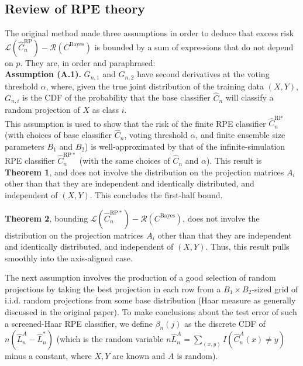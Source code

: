 \documentclass[ejs,preprint]{imsart}
\newcommand\cbayes{C^{\mathrm{Bayes}}}
\newcommand\crpnhat{\hat{C}_{n}^{\mathrm{RP}}}
\newcommand\crpnhatstar{\hat{C}_{n}^{\mathrm{RP*}}}
\newcommand\risk{\mathcal{L}}
\newcommand\rrisk{\mathcal{R}}
\begin{document}
\subsection{Review of RPE theory}\label{sec:review}

The original method made three assumptions in order to deduce that
excess risk $\risk(\crpnhat)-\rrisk(\cbayes)$ is bounded by a sum
of expressions that do not depend on $p$. They are, in order and
paraphrased:\\


\noindent \textbf{Assumption (A.1).} $G_{n,1}$ and $G_{n,2}$ have
second derivatives at the voting threshold $\alpha$, where, given
the true joint distribution of the training data $(X,Y)$, $G_{n,i}$
is the CDF of the probability that the base classifier $\hat{C}_{n}$
will classify a random projection of $X$ as class $i$.\\


This assumption is used to show that the risk of the finite
RPE classifier $\crpnhat$ (with choices of base classifier $\hat{C}_{n}$,
voting threshold $\alpha$, and finite ensemble size parameters $B_{1}$
and $B_{2}$) is well-approximated by that of the infinite-simulation
RPE classifier $\crpnhatstar$ (with the same choices of $\hat{C}_{n}$
and $\alpha$). This result is \textbf{Theorem 1}, and does not involve
the distribution on the projection matrices $A_{i}$ other than that
they are independent and identically distributed, and independent
of $(X,Y)$. This concludes the first-half bound.


\textbf{Theorem 2}, bounding $\risk(\crpnhatstar)-\rrisk(\cbayes)$,
does not involve the distribution on the projection matrices $A_{i}$
other than that they are independent and identically distributed,
and independent of $(X,Y)$. Thus, this result pulls smoothly into
the axis-aligned case.


The next assumption involves the production of a good selection of
random projections by taking the best projection in each row from
a $B_{1}\times B_{2}$-sized grid of i.i.d. random projections from
some base distribution (Haar measure as generally discussed in the
original paper). To make conclusions about the test error of such
a screened-Haar RPE classifier, we define $\beta_{n}(j)$ as the discrete
CDF of $n\left(\hat{L}_{n}^{A}-\hat{L}_{n}^{*}\right)$ (which is
the random variable $n\hat{L}_{n}^{A}=\sum_{(x,y)}I(\hat{C}_{n}^{A}(x)\neq y)$
minus a constant, where $X,Y$ are known and $A$ is random).\\
\end{document}
